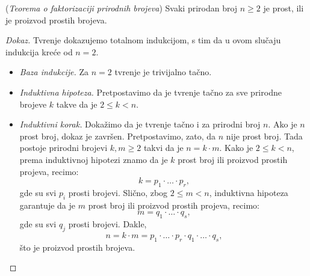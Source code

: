 \begin{EX} (\textit{Teorema o faktorizaciji prirodnih brojeva})
  Svaki prirodan broj $n \ge 2$ je prost, ili je proizvod prostih brojeva.
\end{EX}
\begin{proof}[Dokaz]
  Tvr\dj enje dokazujemo totalnom indukcijom, s tim da u ovom slu\v caju indukcija kre\'ce od $n = 2$.
  \begin{itemize}
  \item
    \emph{Baza indukcije.} Za $n = 2$ tvr\dj enje je trivijalno ta\v cno.
  
  \item
    \emph{Induktivna hipoteza.} Pretpostavimo da je tvr\dj enje ta\v cno za sve prirodne brojeve $k$ takve da je $2 \le k < n$.
  \item
    \emph{Induktivni korak.} Doka\v zimo da je tvr\dj enje ta\v cno i za prirodni broj $n$.
    Ako je $n$ prost broj, dokaz je zavr\v sen. Pretpostavimo, zato, da $n$ nije prost broj.
    Tada postoje prirodni brojevi $k, m \ge 2$ takvi da je $n = k \cdot m$. Kako je $2 \le k < n$, prema induktivnoj hipotezi
    znamo da je $k$ prost broj ili proizvod prostih projeva, recimo:
    $$
      k = p_1 \cdot \ldots \cdot p_r,
    $$
    gde su svi $p_i$ prosti brojevi. Sli\v cno, zbog $2 \le m < n$, induktivna hipoteza garantuje da je $m$ prost broj ili proizvod prostih projeva, recimo:
    $$
      m = q_1 \cdot \ldots \cdot q_s,
    $$
    gde su svi $q_j$ prosti brojevi. Dakle,
    $$
      n = k \cdot m = p_1 \cdot \ldots \cdot p_r \cdot q_1 \cdot \ldots \cdot q_s,
    $$
    \v sto je proizvod prostih brojeva.
  \end{itemize}
\end{proof}

